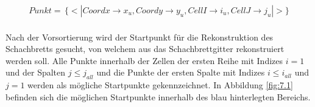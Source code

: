\begin{gather*}
	Punkt = \, \{<|Coordx \rightarrow x_u, Coordy \rightarrow y_u, CellI \rightarrow i_u, CellJ \rightarrow j_u |>\}
\end{gather*} \\


Nach der Vorsortierung wird der Startpunkt für die Rekonstruktion des Schachbretts gesucht, von welchem aus das Schachbrettgitter rekonstruiert werden soll. Alle Punkte innerhalb der Zellen der ersten Reihe mit Indizes $i = 1$ und der Spalten $j \leq  j_{all}$ und die Punkte der ersten Spalte mit Indizes $i \leq i_{all}$ und $j = 1$ werden als mögliche Startpunkte gekennzeichnet. In Abbildung \ref{fig:7.1} befinden sich die möglichen Startpunkte innerhalb des blau hinterlegten Bereichs.\\

%



